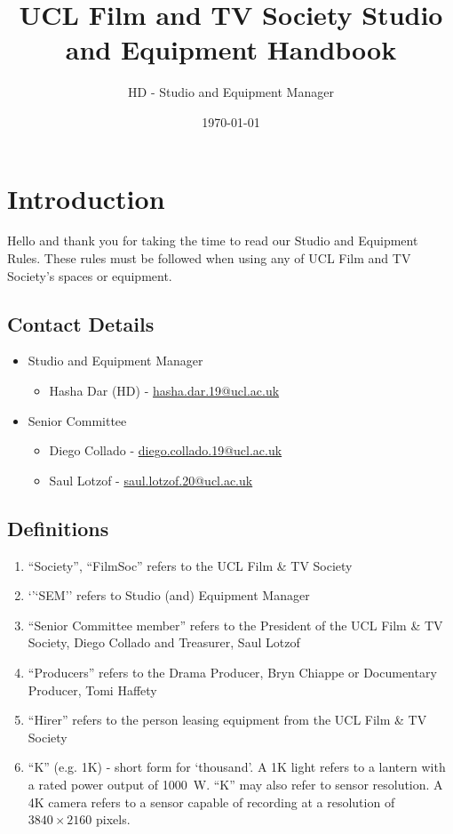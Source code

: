 \documentclass[]{article}
\begin{document}
\title{UCL Film and TV Society Studio and Equipment Handbook}
\author{HD - Studio and Equipment Manager}
\date{\today}
\maketitle
\tableofcontents
\section{Introduction}
Hello and thank you for taking the time to read our Studio and Equipment Rules. These rules must be followed when using any of UCL Film and TV Society's spaces or equipment.
\subsection{Contact Details}
\begin{itemize}
    \item Studio and Equipment Manager
          \begin{itemize}
              \item Hasha Dar (HD) - \href{mailto:hasha.dar.19@ucl.ac.uk}{hasha.dar.19@ucl.ac.uk}
          \end{itemize}
    \item Senior Committee
          \begin{itemize}
              \item Diego Collado - \href{mailto:diego.collado.19@ucl.ac.uk}{diego.collado.19@ucl.ac.uk}
              \item Saul Lotzof - \href{mailto:saul.lotzof.20@ucl.ac.uk}{saul.lotzof.20@ucl.ac.uk}
          \end{itemize}
\end{itemize}
\subsection{Definitions}
\begin{enumerate}
    \item ``Society'', ``FilmSoc'' refers to the UCL Film \& TV Society
    \item `'`SEM'' refers to Studio (and) Equipment Manager
    \item ``Senior Committee member'' refers to the President of the UCL Film \& TV Society, Diego Collado and Treasurer, Saul Lotzof
    \item ``Producers'' refers to the Drama Producer, Bryn Chiappe or Documentary Producer, Tomi Haffety
    \item ``Hirer'' refers to the person leasing equipment from the UCL Film \& TV Society
    \item ``K'' (e.g. 1K) - short form for `thousand'. A 1K light refers to a lantern with a rated power output of \SI{1000}{\watt}. ``K'' may also refer to sensor resolution. A 4K camera refers to a sensor capable of recording at a resolution of $3840 \times 2160$ pixels.
\end{enumerate}
\end{document}
